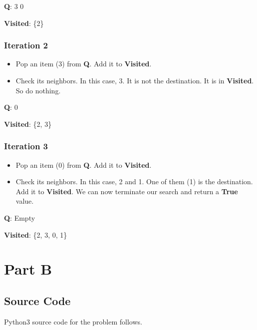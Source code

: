 \documentclass[12pt]{article}
\begin{document}
\textbf{Q}: 3 0

\textbf{Visited}: \{2\}


\subsubsection*{Iteration 2}
\begin{itemize}
  \item Pop an item (3) from \textbf{Q}. Add it to \textbf{Visited}.
  \item Check its neighbors. In this case, 3. It is not the destination. It is in \textbf{Visited}. So do nothing.
\end{itemize}

\textbf{Q}: 0

\textbf{Visited}: \{2, 3\}



\subsubsection*{Iteration 3}
\begin{itemize}
  \item Pop an item (0) from \textbf{Q}. Add it to \textbf{Visited}.
  \item Check its neighbors. In this case, 2 and 1. One of them (1) is the destination. Add it to \textbf{Visited}. We can now terminate our search and return a \textbf{True} value.
\end{itemize}

\textbf{Q}: Empty

\textbf{Visited}: \{2, 3, 0, 1\}

\pagebreak
\section*{Part B}

\subsection*{Source Code}
Python3 source code for the problem follows.
\end{document}
